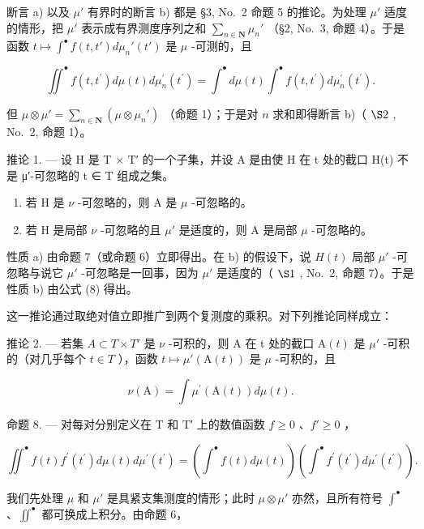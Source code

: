 断言 a) 以及 \(\mu'\) 有界时的断言 b) 都是 §3, No.~2 命题 5 的推论。为处理 \(\mu'\) 适度的情形，把 \(\mu'\) 表示成有界测度序列之和 \(\sum_{n\in\mathbf{N}}\mu_n'\) （§2, No.~3, 命题 4）。于是函数 \(t\mapsto\int^{\bullet}f(t,t')d\mu_n'(t')\) 是 \(\mu\) -可测的，且

\[
\iint^ {\bullet} f (t, t ^ {\prime}) d \mu (t) d \mu_ {n} ^ {\prime} (t ^ {\prime}) = \int^ {\bullet} d \mu (t) \int^ {\bullet} f (t, t ^ {\prime}) d \mu_ {n} ^ {\prime} (t ^ {\prime}).
\]

但 \(\mu \otimes \mu' = \sum_{n \in \mathbf{N}} (\mu \otimes \mu_n')\) （命题 1）；于是对 \(n\) 求和即得断言 b)（ \(\S 2\) , No.~2, 命题 1）。

推论 1. --- 设 H 是 T × T′ 的一个子集，并设 A 是由使 H 在 t 处的截口 H(t) 不是 μ′-可忽略的 t ∈ T 组成之集。

\begin{enumerate}
\def\labelenumi{\alph{enumi})}
\item
  若 H 是 \(\nu\) -可忽略的，则 A 是 \(\mu\) -可忽略的。
\item
  若 H 是局部 \(\nu\) -可忽略的且 \(\mu'\) 是适度的，则 A 是局部 \(\mu\) -可忽略的。
\end{enumerate}

性质 a) 由命题 7（或命题 6）立即得出。在 b) 的假设下，说 \(H(t)\) 局部 \(\mu'\) -可忽略与说它 \(\mu'\) -可忽略是一回事，因为 \(\mu'\) 是适度的（ \(\S1\) , No.~2, 命题 7）。于是性质 b) 由公式 (8) 得出。

这一推论通过取绝对值立即推广到两个复测度的乘积。对下列推论同样成立：

推论 2. --- 若集 \(A \subset T \times T'\) 是 \(\nu\) -可积的，则 A 在 t 处的截口 \(\mathrm{A}(t)\) 是 \(\mu'\) -可积的（对几乎每个 \(t \in T\) ），函数 \(t \mapsto \mu'(\mathrm{A}(t))\) 是 \(\mu\) -可积的，且

\[
\nu (\mathrm{A}) = \int \mu^ {\prime} (\mathrm{A} (t)) d \mu (t).\tag{9}
\]

命题 8. --- 对每对分别定义在 T 和 T′ 上的数值函数 \(f \geqslant 0\) 、\(f' \geqslant 0\) ，

\[
\iint^ {\bullet} f (t) f ^ {\prime} \left(t ^ {\prime}\right) d \mu (t) d \mu^ {\prime} \left(t ^ {\prime}\right) = \left(\int^ {\bullet} f (t) d \mu (t)\right) \left(\int^ {\bullet} f ^ {\prime} \left(t ^ {\prime}\right) d \mu^ {\prime} \left(t ^ {\prime}\right)\right).\tag{10}
\]

我们先处理 \(\mu\) 和 \(\mu'\) 是具紧支集测度的情形；此时 \(\mu \otimes \mu'\) 亦然，且所有符号 \(\int^{\bullet}\) 、\(\iint^{\bullet}\) 都可换成上积分。由命题 6，

